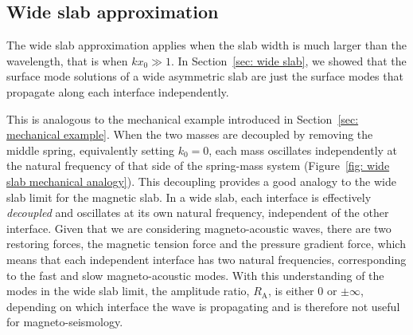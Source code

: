 \documentclass[12pt]{../style-files/ociamthesis}
\begin{document}
\subsection{Wide slab approximation} \label{sec: AR wide slab}
The wide slab approximation applies when the slab width is much larger than the wavelength, that is when $kx_0 \gg 1$. In Section~\ref{sec: wide slab}, we showed that the surface mode solutions of a wide asymmetric slab are just the surface modes that propagate along each interface independently.

This is analogous to the mechanical example introduced in Section~\ref{sec: mechanical example}. When the two masses are decoupled by removing the middle spring, equivalently setting $k_0 = 0$, each mass oscillates independently at the natural frequency of that side of the spring-mass system (Figure~\ref{fig: wide slab mechanical analogy}). This decoupling provides a good analogy to the wide slab limit for the magnetic slab. In a wide slab, each interface is effectively \textit{decoupled} and oscillates at its own natural frequency, independent of the other interface. Given that we are considering magneto-acoustic waves, there are two restoring forces, the magnetic tension force and the pressure gradient force, which means that each independent interface has two natural frequencies, corresponding to the fast and slow magneto-acoustic modes. With this understanding of the modes in the wide slab limit, the amplitude ratio, $R_\textrm{A}$, is either $0$ or $\pm\infty$, depending on which interface the wave is propagating and is therefore not useful for magneto-seismology.
\end{document}

